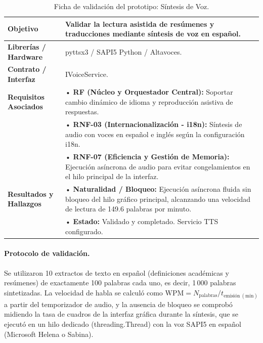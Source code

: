 \begin{table}[H]
    \centering
    \caption{Ficha de validación del prototipo: Síntesis de Voz.}
    \label{tab:ficha_f25}
    \begin{tabular}{|L{3.2cm}|L{11.0cm}|}
        \hline
        \textbf{Objetivo} & Validar la lectura asistida de resúmenes y traducciones mediante síntesis de voz en español. \\ \hline
        \textbf{Librerías / Hardware} & pyttsx3 / SAPI5 Python / Altavoces. \\ \hline
        \textbf{Contrato / Interfaz} & IVoiceService. \\ \hline
        \textbf{Requisitos Asociados} &
        • \textbf{RF (Núcleo y Orquestador Central):} Soportar cambio dinámico de idioma y reproducción asistiva de respuestas. \vspace{0.1cm} \\
        & • \textbf{RNF-03 (Internacionalización - i18n):} Síntesis de audio con voces en español e inglés según la configuración i18n. \vspace{0.1cm} \\
        & • \textbf{RNF-07 (Eficiencia y Gestión de Memoria):} Ejecución asíncrona de audio para evitar congelamientos en el hilo principal de la interfaz. \\ \hline
        \textbf{Resultados y Hallazgos} &
        • \textbf{Naturalidad / Bloqueo:} Ejecución asíncrona fluida sin bloqueo del hilo gráfico principal, alcanzando una velocidad de lectura de 149.6 palabras por minuto. \vspace{0.1cm} \\
        & • \textbf{Estado:} Validado y completado. Servicio TTS configurado. \\ \hline
    \end{tabular}
\end{table}
 
\paragraph{Protocolo de validación.} Se utilizaron 10 extractos de texto en español (definiciones académicas y resúmenes) de exactamente 100 palabras cada uno, es decir, 1\,000 palabras sintetizadas. La velocidad de habla se calculó como $\mathrm{WPM} = N_{\mathrm{palabras}} / t_{\mathrm{emisión\ (min)}}$ a partir del temporizador de audio, y la ausencia de bloqueo se comprobó midiendo la tasa de cuadros de la interfaz gráfica durante la síntesis, que se ejecutó en un hilo dedicado (threading.Thread) con la voz SAPI5 en español (Microsoft Helena o Sabina).
 

